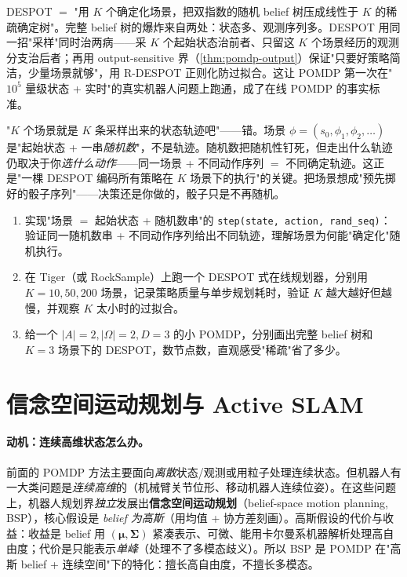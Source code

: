 \begin{insight}
DESPOT $=$ "用 $K$ 个确定化场景，把双指数的随机 belief 树压成线性于 $K$ 的稀疏确定树"。完整 belief 树的爆炸来自两处：状态多、观测序列多。DESPOT 用同一招"采样"同时治两病——采 $K$ 个起始状态治前者、只留这 $K$ 个场景经历的观测分支治后者；再用 output-sensitive 界（\cref{thm:pomdp-output}）保证"只要好策略简洁，少量场景就够"，用 R-DESPOT 正则化防过拟合。这让 POMDP 第一次在"$10^5$ 量级状态 + 实时"的真实机器人问题上跑通，成了在线 POMDP 的事实标准。
\end{insight}

\begin{pitfall}
"$K$ 个场景就是 $K$ 条采样出来的状态轨迹吧"——错。场景 $\phi=(s_0,\phi_1,\phi_2,\dots)$ 是"起始状态 + 一串\emph{随机数}"，不是轨迹。随机数把随机性钉死，但走出什么轨迹仍取决于你\emph{选什么动作}——同一场景 + 不同动作序列 $=$ 不同确定轨迹。这正是"一棵 DESPOT 编码所有策略在 $K$ 场景下的执行"的关键。把场景想成"预先掷好的骰子序列"——决策还是你做的，骰子只是不再随机。
\end{pitfall}

\begin{practice}
\begin{enumerate}
  \item 实现"场景 $=$ 起始状态 + 随机数串"的 \texttt{step(state, action, rand\_seq)}：验证同一随机数串 + 不同动作序列给出不同轨迹，理解场景为何能"确定化"随机执行。
  \item 在 Tiger（或 RockSample）上跑一个 DESPOT 式在线规划器，分别用 $K=10,50,200$ 场景，记录策略质量与单步规划耗时，验证 $K$ 越大越好但越慢，并观察 $K$ 太小时的过拟合。
  \item 给一个 $|A|=2,|\Omega|=2,D=3$ 的小 POMDP，分别画出完整 belief 树和 $K=3$ 场景下的 DESPOT，数节点数，直观感受"稀疏"省了多少。
\end{enumerate}
\end{practice}

\section{信念空间运动规划与 Active SLAM}
\label{sec:pomdp-bsp}

\paragraph{动机：连续高维状态怎么办。}
前面的 POMDP 方法主要面向\emph{离散}状态/观测或用粒子处理连续状态。但机器人有一大类问题是\emph{连续高维}的（机械臂关节位形、移动机器人连续位姿）。在这些问题上，机器人规划界\emph{独立}发展出\textbf{信念空间运动规划}（belief-space motion planning, BSP），核心假设是 \emph{belief 为高斯}（用均值 + 协方差刻画）。高斯假设的代价与收益：收益是 belief 用 $(\boldsymbol{\mu},\boldsymbol{\Sigma})$ 紧凑表示、可微、能用卡尔曼系机器解析处理高自由度；代价是只能表示\emph{单峰}（处理不了多模态歧义）。所以 BSP 是 POMDP 在"高斯 belief + 连续空间"下的特化：擅长高自由度，不擅长多模态。

